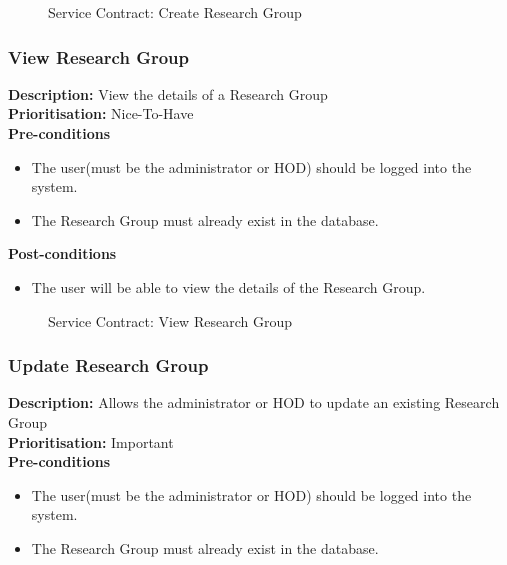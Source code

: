 \documentclass[a4paper]{article}
\begin{document}
	\begin{figure}[H]
		\centering
		\caption{Service Contract: Create Research Group}
	\end{figure}
	
	\pagebreak
	\subsubsection{View Research Group}
	\textbf{Description:} View the details of a Research Group \\
	\textbf{Prioritisation:} Nice-To-Have\\
	
	\textbf{Pre-conditions}
	\begin{itemize}
		\item The user(must be the administrator or HOD) should be logged into the system.
		\item The Research Group must already exist in the database.
	\end{itemize}
	
	\textbf{Post-conditions}
	\begin{itemize}
		\item The user will be able to view the details of the Research Group.
	\end{itemize}
	
	\begin{figure}[H]
		\centering
		\caption{Service Contract: View Research Group}
	\end{figure}
	
	\pagebreak
	\subsubsection{Update Research Group}
	\textbf{Description:} Allows the administrator or HOD to update an existing Research Group\\
	\textbf{Prioritisation:} Important\\
	
	\textbf{Pre-conditions}
	\begin{itemize}
		\item The user(must be the administrator or HOD) should be logged into the system.
		\item The Research Group must already exist in the database.
	\end{itemize}
	
\end{document}
